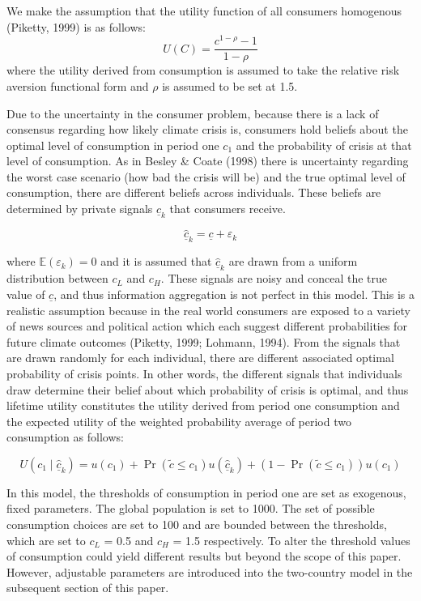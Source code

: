\documentclass[11pt,preprint, authoryear]{elsarticle}
\numberwithin{equation}{section}
\numberwithin{figure}{section}
\numberwithin{table}{section}
\begin{document}
We make the assumption that the utility function of all consumers
homogenous (Piketty, 1999) is as follows: \[
U(C)=\frac{c^{1-\rho}-1}{1-\rho}
\] where the utility derived from consumption is assumed to take the
relative risk aversion functional form and \(\rho\) is assumed to be set
at 1.5.

Due to the uncertainty in the consumer problem, because there is a lack
of consensus regarding how likely climate crisis is, consumers hold
beliefs about the optimal level of consumption in period one \(c_1\) and
the probability of crisis at that level of consumption. As in Besley \&
Coate (1998) there is uncertainty regarding the worst case scenario (how
bad the crisis will be) and the true optimal level of consumption, there
are different beliefs across individuals. These beliefs are determined
by private signals \(\hat{\underline{c}}_k\) that consumers receive.

\[
\hat{\underline{c}}_k=\underline{c}+\varepsilon_k
\]

where \(\mathbb{E}\left(\varepsilon_k\right)=0\) and it is assumed that
\(\hat{\underline{c}}_k\) are drawn from a uniform distribution between
\(c_L\) and \(c_H\). These signals are noisy and conceal the true value
of \(\underline{c}\), and thus information aggregation is not perfect in
this model. This is a realistic assumption because in the real world
consumers are exposed to a variety of news sources and political action
which each suggest different probabilities for future climate outcomes
(Piketty, 1999; Lohmann, 1994). From the signals that are drawn randomly
for each individual, there are different associated optimal probability
of crisis points. In other words, the different signals that individuals
draw determine their belief about which probability of crisis is
optimal, and thus lifetime utility constitutes the utility derived from
period one consumption and the expected utility of the weighted
probability average of period two consumption as follows:

\[
U\left(c_1 \mid \hat{\underline{c}}_{k}\right)=u\left(c_1\right)+\operatorname{Pr}\left(\tilde{c} \leq c_1\right) u\left(\hat{\underline{c}}_{k}\right)+\left(1-\operatorname{Pr}\left(\tilde{c} \leq c_1\right)\right) u\left(c_1\right)
\]

In this model, the thresholds of consumption in period one are set as
exogenous, fixed parameters. The global population is set to 1000. The
set of possible consumption choices are set to 100 and are bounded
between the thresholds, which are set to \(c_L\) = 0.5 and \(c_H\) = 1.5
respectively. To alter the threshold values of consumption could yield
different results but beyond the scope of this paper. However,
adjustable parameters are introduced into the two-country model in the
subsequent section of this paper.
\end{document}
